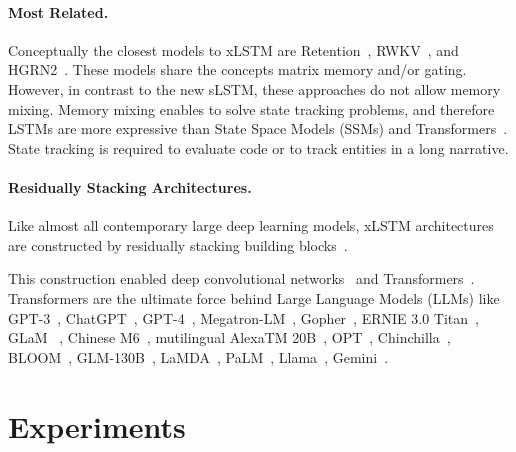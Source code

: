 \paragraph{Most Related.} Conceptually the closest models to xLSTM are Retention~\citep{Sun:23arxiv}, RWKV~\citep{Peng:23arxivshort,Peng:24arxivshort}, and HGRN2~\citep{Qin:24arxiv}. These models share the concepts matrix memory and/or gating. However, in contrast to the new sLSTM, these approaches do not allow memory mixing. Memory mixing enables to solve state tracking problems, and therefore LSTMs are more expressive than State Space Models (SSMs) and Transformers~\citep{Merrill:24,Deletang:23}. State tracking is required to evaluate code or to track entities in a long narrative.

\paragraph{Residually Stacking Architectures.} Like almost all contemporary large deep learning models, xLSTM architectures are constructed by residually stacking building blocks~\citep{Srivastava:15,He:16}.

This construction enabled deep convolutional networks~\citep{He:16} and Transformers~\citep{Vaswani:17}. Transformers are the ultimate force behind Large Language Models (LLMs) like GPT-3~\citep{Brown:20short}, ChatGPT~\citep{Schulman:22short}, GPT-4~\citep{Achiam:23gpt4short}, Megatron-LM~\citep{Shoeybi:19}, Gopher~\citep{Rae:21short}, ERNIE 3.0 Titan~\citep{Wang:21arxivshort}, GLaM ~\citep{Du:21glamshort}, Chinese M6~\citep{Lin:21}, mutilingual AlexaTM 20B~\citep{Soltan:22}, OPT~\citep{Zhang:22opt}, Chinchilla~\citep{Hoffmann:22short}, BLOOM~\citep{Scao:22arxivshort}, GLM-130B~\citep{Zeng:22arxivshort}, LaMDA~\citep{Thoppilan:22short}, PaLM~\citep{Chowdhery:22short}, Llama~\citep{Touvron:23arxiv}, Gemini~\citep{GeminiTeam:23arxiv,Reid:24arxiv}.

\section{Experiments}
\label{sec:Exp}

